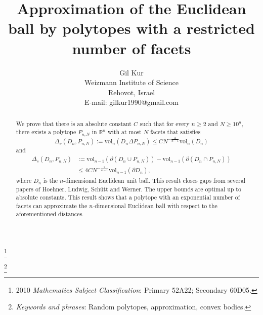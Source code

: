 \documentclass[10pt, twoside, leqno]{article}
\theoremstyle{definition}
\numberwithin{equation}{section}
\newcommand{\R}{\mathbb{R}}
\newcommand{\NN}{N^{-\frac 2{n-1} }}
\begin{document}

\baselineskip=17pt



\title{Approximation of the Euclidean ball by polytopes with a restricted number of facets}

\author{Gil Kur \\
Weizmann Institute of Science\\ 
 Rehovot, Israel\\
E-mail: gilkur1990@gmail.com}
\date{}

\maketitle


\renewcommand{\thefootnote}{}

\footnote{2010 \emph{Mathematics Subject Classification}: Primary 52A22; Secondary 60D05.}

\footnote{\emph{Keywords and phrases}: Random polytopes, approximation, convex bodies.}

\renewcommand{\thefootnote}{\arabic{footnote}}
\setcounter{footnote}{0}


	\begin{abstract}
	We prove that there is an absolute constant $ C$ such that for every $ n \geq 2 $ and $ N\geq 10^n, $ there exists a polytope $ P_{n,N} $ in $ \R^n $ with at most $ N $ facets that satisfies
		\begin{equation*}
		\Delta_{v}(D_n,P_{n,N}):=\text{vol}_n\left(D_n \Delta P_{n,N}\right)\leq C\NN \text{vol}_n\left(D_n\right)
		\end{equation*}
		and
		\begin{align*}
				 \Delta_{s}(D_n,P_{n,N})&:=\text{vol}_{n-1}\left(\partial\left(D_n\cup P_{n,N}\right)\right) - \text{vol}_{n-1}\left(\partial\left(D_n\cap P_{n,N}\right)\right)\\&\leq 4C\NN \text{vol}_{n-1}\left(\partial D_n\right),
		\end{align*} 
		where $ D_n $ is the $ n$-dimensional Euclidean unit ball.
	This result closes gaps from several papers of Hoehner, Ludwig, Sch\"utt and Werner. The upper bounds are optimal up to absolute constants. This result shows that a polytope with an exponential number of facets can approximate the $ n$-dimensional Euclidean ball with respect to the aforementioned distances.  
\end{abstract}
\end{document}
